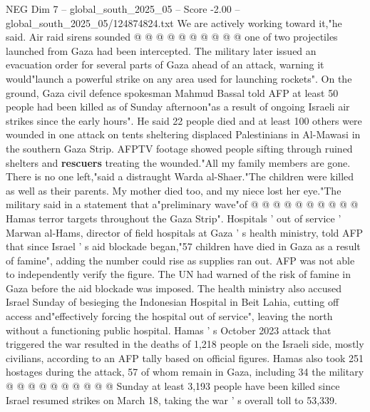\begin{textsample}{NEG Dim 7 – global\_south\_2025\_05 – Score -2.00 – global\_south\_2025\_05/124874824.txt}
We are actively working toward it,"he said.
Air raid sirens sounded @ @ @ @ @ @ @ @ @ @ one of two projectiles launched from Gaza had been intercepted.
The military later issued an evacuation order for several parts of Gaza ahead of an attack, warning it would"launch a powerful strike on any area used for launching rockets".
On the ground, Gaza civil defence spokesman Mahmud Bassal told AFP at least 50 people had been killed as of Sunday afternoon"as a result of ongoing Israeli air strikes since the early hours".
He said 22 people died and at least 100 others were wounded in one attack on tents sheltering displaced Palestinians in Al-Mawasi in the southern Gaza Strip.
AFPTV footage showed people sifting through ruined shelters and \textbf{rescuers} treating the wounded."All my family members are gone.
There is no one left,"said a distraught Warda al-Shaer."The children were killed as well as their parents.
My mother died too, and my niece lost her eye."The military said in a statement that a"preliminary wave"of @ @ @ @ @ @ @ @ @ @ Hamas terror targets throughout the Gaza Strip".
Hospitals ' out of service ' Marwan al-Hams, director of field hospitals at Gaza ' s health ministry, told AFP that since Israel ' s aid blockade began,"57 children have died in Gaza as a result of famine", adding the number could rise as supplies ran out.
AFP was not able to independently verify the figure.
The UN had warned of the risk of famine in Gaza before the aid blockade was imposed.
The health ministry also accused Israel Sunday of besieging the Indonesian Hospital in Beit Lahia, cutting off access and"effectively forcing the hospital out of service", leaving the north without a functioning public hospital.
Hamas ' s October 2023 attack that triggered the war resulted in the deaths of 1,218 people on the Israeli side, mostly civilians, according to an AFP tally based on official figures.
Hamas also took 251 hostages during the attack, 57 of whom remain in Gaza, including 34 the military @ @ @ @ @ @ @ @ @ @ Sunday at least 3,193 people have been killed since Israel resumed strikes on March 18, taking the war ' s overall toll to 53,339.

\end{textsample}
